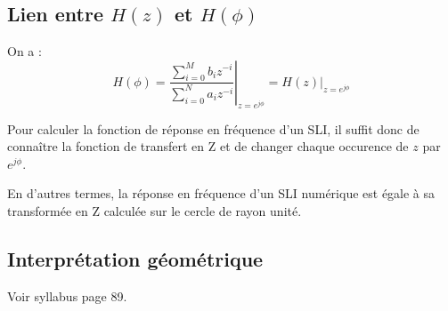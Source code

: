         \subsection{Lien entre $H(z)$ et $H(\phi)$}
            On a :
            \begin{equation}
                H(\phi) = {\left.\frac{\sum\limits_{i=0}^M b_iz^{-i}}{\sum\limits_{i=0}^N a_i z^{-i}}\right|}_{z=e^{j\phi}} = {\left.H(z)\right|}_{z=e^{j\phi}}
            \end{equation}

            Pour calculer la fonction de réponse en fréquence d'un SLI, il suffit donc de connaître la fonction de transfert en Z et de changer chaque occurence de $z$ par $e^{j\phi}$.

            En d'autres termes, la réponse en fréquence d'un SLI numérique est égale à sa transformée en Z calculée sur le cercle de rayon unité.

        \subsection{Interprétation géométrique}
            Voir syllabus page 89.
